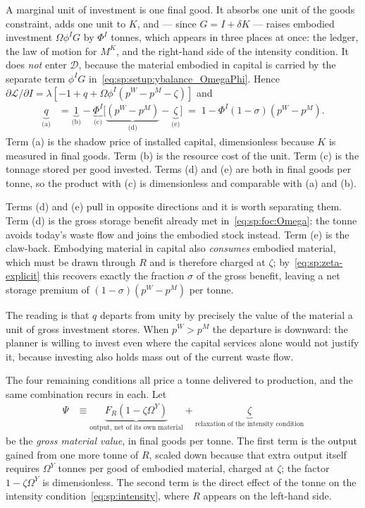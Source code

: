  A marginal unit of investment is one final good. It absorbs one unit of the goods constraint, adds one unit to $K$, and --- since $G=I+\delta K$ --- raises embodied investment $\Omega\phi^IG$ by $\Phi^I$ tonnes, which appears in three places at once: the ledger, the law of motion for $M^K$, and the right-hand side of the intensity condition. It does \emph{not} enter $\mathcal D$, because the material embodied in capital is carried by the separate term $\phi^IG$ in~\eqref{eq:sp:setup:ybalance_OmegaPhi}. Hence $\partial\mathcal L/\partial I=\lambda\left[-1+q+\Omega\phi^I\left(p^W-p^M-\zeta\right)\right]$ and
\begin{align}
\underbrace{q}_{\text{(a)}} &= \underbrace{1}_{\text{(b)}}-\underbrace{\Phi^I}_{\text{(c)}}\Big[\underbrace{\left(p^W-p^M\right)}_{\text{(d)}}-\underbrace{\zeta}_{\text{(e)}}\Big]
\;=\;1-\Phi^I\left(1-\sigma\right)\left(p^W-p^M\right).
\label{eq:sp:foc:I}
\end{align}
Term (a) is the shadow price of installed capital, dimensionless because $K$ is measured in final goods. Term (b) is the resource cost of the unit. Term (c) is the tonnage stored per good invested. Terms (d) and (e) are both in final goods per tonne, so the product with (c) is dimensionless and comparable with (a) and (b).

Terms (d) and (e) pull in opposite directions and it is worth separating them. Term (d) is the gross storage benefit already met in~\eqref{eq:sp:foc:Omega}: the tonne avoids today's waste flow and joins the embodied stock instead. Term (e) is the claw-back. Embodying material in capital also \emph{consumes} embodied material, which must be drawn through $R$ and is therefore charged at $\zeta$; by~\eqref{eq:sp:zeta-explicit} this recovers exactly the fraction $\sigma$ of the gross benefit, leaving a net storage premium of $\left(1-\sigma\right)\left(p^W-p^M\right)$ per tonne.

The reading is that $q$ departs from unity by precisely the value of the material a unit of gross investment stores. When $p^W>p^M$ the departure is downward: the planner is willing to invest even where the capital services alone would not justify it, because investing also holds mass out of the current waste flow.

 The four remaining conditions all price a tonne delivered to production, and the same combination recurs in each. Let
\begin{align}
\Psi &\equiv \underbrace{F_R\left(1-\zeta\Omega^Y\right)}_{\text{output, net of its own material}}+\underbrace{\zeta}_{\text{relaxation of the intensity condition}}
\label{eq:sp:Psi}
\end{align}
be the \emph{gross material value}, in final goods per tonne. The first term is the output gained from one more tonne of $R$, scaled down because that extra output itself requires $\Omega^Y$ tonnes per good of embodied material, charged at $\zeta$; the factor $1-\zeta\Omega^Y$ is dimensionless. The second term is the direct effect of the tonne on the intensity condition~\eqref{eq:sp:intensity}, where $R$ appears on the left-hand side.

